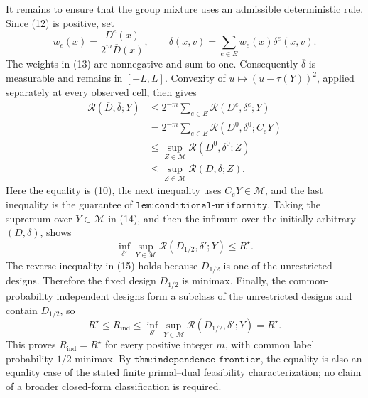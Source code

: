 It remains to ensure that the group mixture uses an admissible
deterministic rule.  Since (12) is positive, set
\[
 w_e(x)=\frac{D^e(x)}{2^m\overline D(x)},\qquad
 \overline\delta(x,v)=\sum_{e\in E}w_e(x)\delta^e(x,v).              \tag{13}
\]
The weights in (13) are nonnegative and sum to one.  Consequently
\(\overline\delta\) is measurable and remains in \([-L,L]\).  Convexity
of \(u\mapsto(u-\tau(Y))^2\), applied separately at every observed cell,
then gives
\[
\begin{aligned}
 \mathcal R(\overline D,\overline\delta;Y)
 &\le 2^{-m}\sum_{e\in E}\mathcal R(D^e,\delta^e;Y)\\
 &=2^{-m}\sum_{e\in E}\mathcal R(D^0,\delta^0;C_eY)\\
 &\le \sup_{Z\in\mathcal M}\mathcal R(D^0,\delta^0;Z)\\
 &\le \sup_{Z\in\mathcal M}\mathcal R(D,\delta;Z).                \tag{14}
\end{aligned}
\]
Here the equality is (10), the next inequality uses
\(C_eY\in\mathcal M\), and the last inequality is the guarantee of
\(\texttt{lem:conditional-uniformity}\).  Taking the supremum over
\(Y\in\mathcal M\) in (14), and then the infimum over the initially
arbitrary \((D,\delta)\), shows
\[
 \inf_{\delta'}\sup_{Y\in\mathcal M}
       \mathcal R(D_{1/2},\delta';Y)\le R^\star.                     \tag{15}
\]
The reverse inequality in (15) holds because \(D_{1/2}\) is one of the
unrestricted designs.  Therefore the fixed design \(D_{1/2}\) is minimax.
Finally, the common-probability independent designs form a subclass of the
unrestricted designs and contain \(D_{1/2}\), so
\[
 R^\star\le R_{\mathrm{ind}}
 \le\inf_{\delta'}\sup_{Y\in\mathcal M}
       \mathcal R(D_{1/2},\delta';Y)
 =R^\star.                                                          \tag{16}
\]
This proves \(R_{\mathrm{ind}}=R^\star\) for every positive integer
\(m\), with common label probability \(1/2\) minimax.  By
\(\texttt{thm:independence-frontier}\), the equality is also an equality
case of the stated finite primal--dual feasibility characterization; no
claim of a broader closed-form classification is required.
